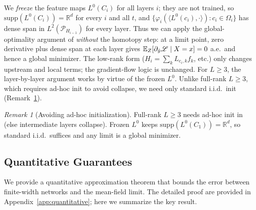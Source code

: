 \documentclass[nohyperref]{article}
\theoremstyle{plain}
\theoremstyle{definition}
\theoremstyle{remark}
\newtheorem{remark}[theorem]{Remark}
\begin{document}
We \emph{freeze} the feature maps $L^0(C_i)$ for all layers $i$; they are not trained, so $\text{supp}(L^0(C_i)) = \mathbb{R}^d$ for every $i$ and all $t$, and $\{\varphi_i(\langle L^0(c_i), \cdot \rangle) : c_i \in \Omega_i\}$ has dense span in $L^2(\mathcal{P}_{H_{i-1}})$ for every layer. Thus we can apply the global-optimality argument of \cite{nguyen2023rigorousframeworkmeanfield} \emph{without} the homotopy step: at a limit point, zero derivative plus dense span at each layer gives $\mathbb{E}_Z[\partial_{\hat{y}}\mathscr{L} \mid X = x] = 0$ a.e.\ and hence a global minimizer. The low-rank form ($H_i = \sum_k L_{c_i,k} f_k$, etc.) only changes upstream and local terms; the gradient-flow logic is unchanged. For $L \geq 3$, the layer-by-layer argument works by virtue of the frozen $L^0$. Unlike full-rank $L \geq 3$, which requires ad-hoc init to avoid collapse, we need only standard i.i.d.\ init (Remark~\ref{rem:correlated-init}).

\begin{remark}[Avoiding ad-hoc initialization]
\label{rem:correlated-init}
Full-rank $L \geq 3$ needs ad-hoc init in \cite{nguyen2023rigorousframeworkmeanfield} (else intermediate layers collapse). Frozen $L^0$ keeps $\text{supp}(L^0(C_1)) = \mathbb{R}^d$, so standard i.i.d.\ suffices and any limit is a global minimizer.
\end{remark}

















\subsection{Quantitative Guarantees}
\label{sec:rate}

We provide a quantitative approximation theorem that bounds the error between finite-width networks and the mean-field limit. The detailed proof are provided in Appendix~\ref{app:quantitative}; here we summarize the key result.
\end{document}
